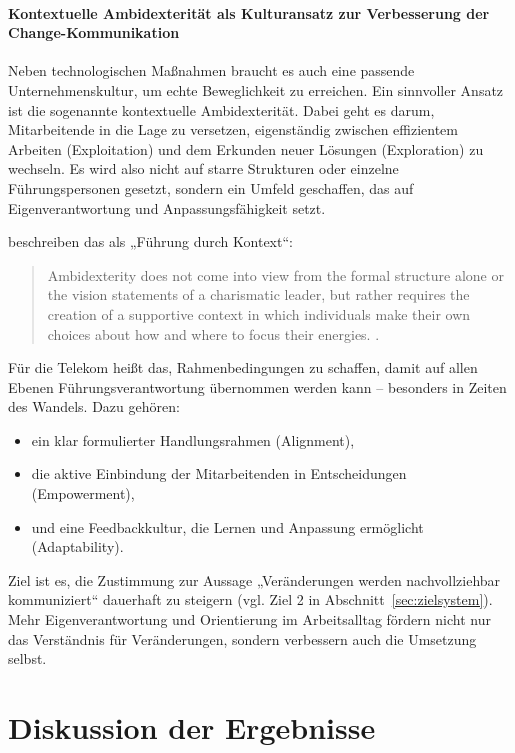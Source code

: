 \documentclass[12pt,a4paper]{article}
\begin{document}
\paragraph{Kontextuelle Ambidexterität als Kulturansatz zur Verbesserung der Change-Kommunikation}

Neben technologischen Maßnahmen braucht es auch eine passende Unternehmenskultur, um echte Beweglichkeit zu erreichen. Ein sinnvoller Ansatz ist die sogenannte kontextuelle Ambidexterität. Dabei geht es darum, Mitarbeitende in die Lage zu versetzen, eigenständig zwischen effizientem Arbeiten (Exploitation) und dem Erkunden neuer Lösungen (Exploration) zu wechseln. Es wird also nicht auf starre Strukturen oder einzelne Führungspersonen gesetzt, sondern ein Umfeld geschaffen, das auf Eigenverantwortung und Anpassungsfähigkeit setzt.

\noindent\textcite{kumkale_organizational_2022} beschreiben das als „Führung durch Kontext“:

\begin{quote}
	Ambidexterity does not come into view from the formal structure alone or the vision statements of a charismatic leader, but rather requires the creation of a supportive context in which individuals make their own choices about how and where to focus their energies. \parencite[18]{kumkale_organizational_2022}.
\end{quote}

\noindent Für die Telekom heißt das, Rahmenbedingungen zu schaffen, damit auf allen Ebenen Führungsverantwortung übernommen werden kann – besonders in Zeiten des Wandels. Dazu gehören:

\begin{itemize}
	\item ein klar formulierter Handlungsrahmen (Alignment),
	\item die aktive Einbindung der Mitarbeitenden in Entscheidungen (Empowerment),
	\item und eine Feedbackkultur, die Lernen und Anpassung ermöglicht (Adaptability).
\end{itemize}

\noindent Ziel ist es, die Zustimmung zur Aussage „Veränderungen werden nachvollziehbar kommuniziert“ dauerhaft zu steigern (vgl. Ziel 2 in Abschnitt~\ref{sec:zielsystem}). Mehr Eigenverantwortung und Orientierung im Arbeitsalltag fördern nicht nur das Verständnis für Veränderungen, sondern verbessern auch die Umsetzung selbst.

	
	\section{Diskussion der Ergebnisse}
\end{document}
